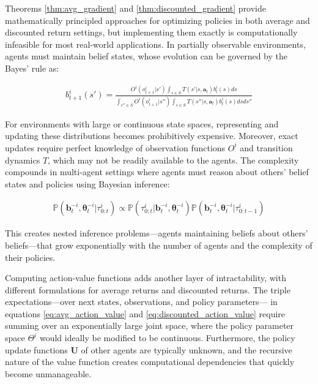 \documentclass[a4paper,12pt]{report}
\begin{document}
Theorems \ref{thm:avg_gradient} and \ref{thm:discounted_gradient} provide mathematically principled approaches for optimizing policies in both average and discounted return settings, but implementing them exactly is computationally infeasible for most real-world applications. In partially observable environments, agents must maintain belief states, whose evolution can be governed by the Bayes' rule as:

\begin{align}
    b^i_{t+1}(s') = \frac{O^i(o^i_{t+1}|s') \int_{s \in S} T(s'|s, \boldsymbol{a}_t) b^i_t(s) ds}{\int_{s'' \in S} O^i(o^i_{t+1}|s'') \int_{s \in S} T(s''|s, \boldsymbol{a}_t) b^i_t(s) ds ds''}
\end{align}

For environments with large or continuous state spaces, representing and updating these distributions becomes prohibitively expensive. Moreover, exact updates require perfect knowledge of observation functions $O^i$ and transition dynamics $T$, which may not be readily available to the agents. The complexity compounds in multi-agent settings where agents must reason about others' belief states and policies using Bayesian inference:

\begin{align}
    \mathbb{P}(\boldsymbol{b}^{-i}_t, \boldsymbol{\theta}^{-i}_t | \tau^i_{0:t}) \propto \mathbb{P}(\tau^i_{0:t} | \boldsymbol{b}^{-i}_t, \boldsymbol{\theta}^{-i}_t) \mathbb{P}(\boldsymbol{b}^{-i}_t, \boldsymbol{\theta}^{-i}_t | \tau^i_{0:t-1})
\end{align}

This creates nested inference problems—agents maintaining beliefs about others' beliefs—that grow exponentially with the number of agents and the complexity of their policies.

Computing action-value functions adds another layer of intractability, with different formulations for average returns and discounted returns. The triple expectations—over next states, observations, and policy parameters— in equations \eqref{eq:avg_action_value} and \eqref{eq:discounted_action_value} require summing over an exponentially large joint space, where the policy parameter space $\Theta^i$ would ideally be modified to be continuous. Furthermore, the policy update functions $\boldsymbol{U}$ of other agents are typically unknown, and the recursive nature of the value function creates computational dependencies that quickly become unmanageable.
\end{document}
